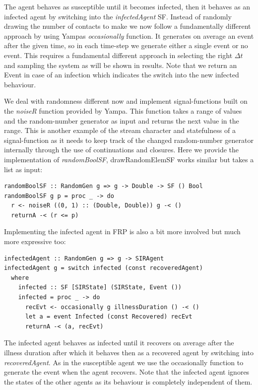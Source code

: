 The agent behaves as susceptible until it becomes infected, then it behaves as an infected agent by switching into the \textit{infectedAgent} SF. Instead of randomly drawing the number of contacts to make we now follow a fundamentally different approach by using Yampas \textit{occasionally} function. It generates on average an event after the given time, so in each time-step we generate either a single event or no event. This requires a fundamental different approach in selecting the right $\Delta t$ and sampling the system as will be shown in results. Note that we return an Event in case of an infection which indicates the switch into the new infected behaviour.

We deal with randomness different now and implement signal-functions built on the \textit{noiseR} function provided by Yampa. This function takes a range of values and the random-number generator as input and returns the next value in the range. This is another example of the stream character and statefulness of a signal-function as it needs to keep track of the changed random-number generator internally through the use of continuations and closures. Here we provide the implementation of \textit{randomBoolSF}, drawRandomElemSF works similar but takes a list as input:

\begin{verbatim}
randomBoolSF :: RandomGen g => g -> Double -> SF () Bool
randomBoolSF g p = proc _ -> do
  r <- noiseR ((0, 1) :: (Double, Double)) g -< ()
  returnA -< (r <= p)
\end{verbatim}

Implementing the infected agent in FRP is also a bit more involved but much more expressive too:

\begin{verbatim}
infectedAgent :: RandomGen g => g -> SIRAgent
infectedAgent g = switch infected (const recoveredAgent)
  where
    infected :: SF [SIRState] (SIRState, Event ())
    infected = proc _ -> do
      recEvt <- occasionally g illnessDuration () -< ()
      let a = event Infected (const Recovered) recEvt
      returnA -< (a, recEvt)
\end{verbatim}

The infected agent behaves as infected until it recovers on average after the illness duration after which it behaves then as a recovered agent by switching into \textit{recoveredAgent}. As in the susceptible agent we use the occasionally function to generate the event when the agent recovers. Note that the infected agent ignores the states of the other agents as its behaviour is completely independent of them.

